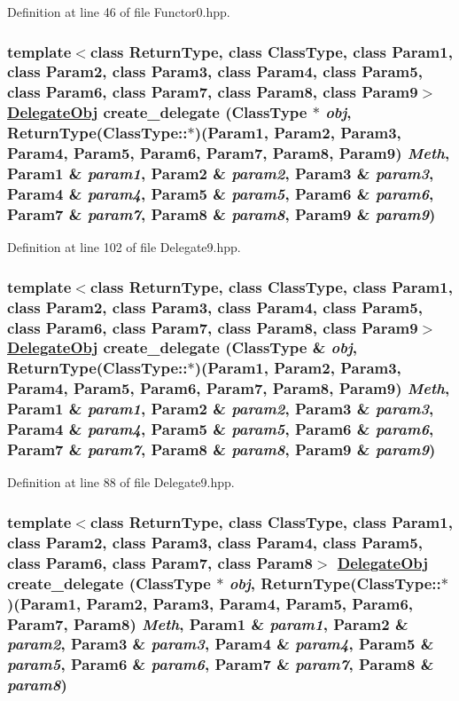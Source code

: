 Definition at line 46 of file Functor0.hpp.\hypertarget{namespaceDL_a22}{
\subsubsection[create\_\-delegate]{\setlength{\rightskip}{0pt plus 5cm}template$<$class Return\-Type, class Class\-Type, class Param1, class Param2, class Param3, class Param4, class Param5, class Param6, class Param7, class Param8, class Param9$>$ \hyperlink{namespaceDL_a0}{Delegate\-Obj} create\_\-delegate (Class\-Type $\ast$ {\em obj}, Return\-Type(Class\-Type::$\ast$)(Param1, Param2, Param3, Param4, Param5, Param6, Param7, Param8, Param9) {\em Meth}, Param1 \& {\em param1}, Param2 \& {\em param2}, Param3 \& {\em param3}, Param4 \& {\em param4}, Param5 \& {\em param5}, Param6 \& {\em param6}, Param7 \& {\em param7}, Param8 \& {\em param8}, Param9 \& {\em param9})}}
\label{namespaceDL_a22}




Definition at line 102 of file Delegate9.hpp.\hypertarget{namespaceDL_a21}{
\subsubsection[create\_\-delegate]{\setlength{\rightskip}{0pt plus 5cm}template$<$class Return\-Type, class Class\-Type, class Param1, class Param2, class Param3, class Param4, class Param5, class Param6, class Param7, class Param8, class Param9$>$ \hyperlink{namespaceDL_a0}{Delegate\-Obj} create\_\-delegate (Class\-Type \& {\em obj}, Return\-Type(Class\-Type::$\ast$)(Param1, Param2, Param3, Param4, Param5, Param6, Param7, Param8, Param9) {\em Meth}, Param1 \& {\em param1}, Param2 \& {\em param2}, Param3 \& {\em param3}, Param4 \& {\em param4}, Param5 \& {\em param5}, Param6 \& {\em param6}, Param7 \& {\em param7}, Param8 \& {\em param8}, Param9 \& {\em param9})}}
\label{namespaceDL_a21}




Definition at line 88 of file Delegate9.hpp.\hypertarget{namespaceDL_a20}{
\subsubsection[create\_\-delegate]{\setlength{\rightskip}{0pt plus 5cm}template$<$class Return\-Type, class Class\-Type, class Param1, class Param2, class Param3, class Param4, class Param5, class Param6, class Param7, class Param8$>$ \hyperlink{namespaceDL_a0}{Delegate\-Obj} create\_\-delegate (Class\-Type $\ast$ {\em obj}, Return\-Type(Class\-Type::$\ast$)(Param1, Param2, Param3, Param4, Param5, Param6, Param7, Param8) {\em Meth}, Param1 \& {\em param1}, Param2 \& {\em param2}, Param3 \& {\em param3}, Param4 \& {\em param4}, Param5 \& {\em param5}, Param6 \& {\em param6}, Param7 \& {\em param7}, Param8 \& {\em param8})}}
\label{namespaceDL_a20}




